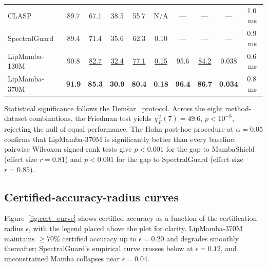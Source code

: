 \documentclass[12pt,a4paper]{article}
\theoremstyle{definition}
\theoremstyle{remark}
\newcommand{\modelname}{LipMamba}
\begin{document}
\begin{table}[!t]
\begin{tabular}{@{}l
  *{5}{c}@{\hskip 4pt}!{\vrule width 0.4pt}@{\hskip 4pt}*{4}{c}@{}}
CLASP~\cite{lemercier2026clasp}
  & 89.7 & 67.1 & 38.5 & 55.7 & N/A
  & --- & --- & --- & 1.0\,ms \\
SpectralGuard~\cite{lemercier2026spectralguard}
  & 89.4 & 71.4 & 35.6 & 62.3 & 0.10
  & --- & --- & --- & 0.9\,ms \\
\midrule
\modelname{}-130M
  & 90.8 & \underline{82.7} & \underline{32.4} & \underline{77.1} & \underline{0.15}
  & 95.6 & \underline{84.2} & 0.038 & 0.6\,ms \\
\modelname{}-370M
  & \textbf{91.9} & \textbf{85.3} & \textbf{30.9} & \textbf{80.4} & \textbf{0.18}
  & \textbf{96.4} & \textbf{86.7} & \textbf{0.034} & 0.8\,ms \\
\bottomrule
\end{tabular}
\end{table}

Statistical significance follows the Demšar~\cite{demsar2006statistical} protocol. Across the eight method-dataset combinations, the Friedman test yields $\chi_F^2(7) = 49.6$, $p < 10^{-8}$, rejecting the null of equal performance. The Holm post-hoc procedure at $\alpha = 0.05$ confirms that \modelname{}-370M is significantly better than every baseline; pairwise Wilcoxon signed-rank tests give $p < 0.001$ for the gap to MambaShield (effect size $r = 0.81$) and $p < 0.001$ for the gap to SpectralGuard (effect size $r = 0.85$).

\subsection{Certified-accuracy-radius curves}

Figure~\ref{fig:cert_curve} shows certified accuracy as a function of the certification radius $\epsilon$, with the legend placed above the plot for clarity. \modelname{}-370M maintains $\geq 70\%$ certified accuracy up to $\epsilon = 0.20$ and degrades smoothly thereafter; SpectralGuard's empirical curve crosses below at $\epsilon = 0.12$, and unconstrained Mamba collapses near $\epsilon = 0.04$.
\end{document}
